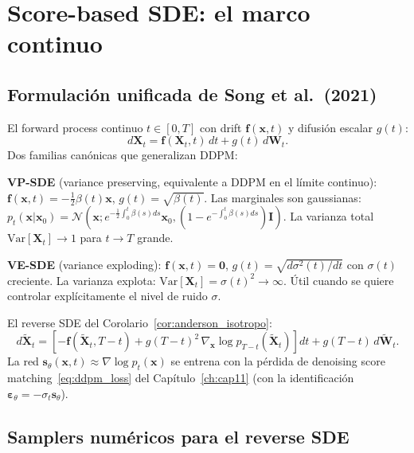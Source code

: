 \section{Score-based SDE: el marco continuo}
\label{sec:score_sde}

\subsection{Formulación unificada de Song et al.\ (2021)}
\label{subsec:score_sde_formulacion}

El forward process continuo $t\in[0,T]$ con drift $\bm{f}(\bm{x},t)$ y difusión
escalar $g(t)$:
\begin{equation}
  d\bm{X}_t = \bm{f}(\bm{X}_t,t)\,dt + g(t)\,d\bm{W}_t.
  \label{eq:score_sde_forward}
\end{equation}
Dos familias canónicas que generalizan DDPM:

\textbf{VP-SDE} (variance preserving, equivalente a DDPM en el límite continuo):
$\bm{f}(\bm{x},t) = -\frac{1}{2}\beta(t)\bm{x}$, $g(t) = \sqrt{\beta(t)}$.
Las marginales son gaussianas: $p_t(\bm{x}|\bm{x}_0) = \mathcal{N}(\bm{x};
e^{-\frac{1}{2}\int_0^t\beta(s)ds}\bm{x}_0, (1-e^{-\int_0^t\beta(s)ds})\bm{I})$.
La varianza total $\mathrm{Var}[\bm{X}_t] \to 1$ para $t\to T$ grande.

\textbf{VE-SDE} (variance exploding): $\bm{f}(\bm{x},t) = \bm{0}$, $g(t) =
\sqrt{d\sigma^2(t)/dt}$ con $\sigma(t)$ creciente. La varianza explota:
$\mathrm{Var}[\bm{X}_t] = \sigma(t)^2 \to\infty$. Útil cuando se quiere
controlar explícitamente el nivel de ruido $\sigma$.

El reverse SDE del Corolario~\ref{cor:anderson_isotropo}:
\begin{equation}
  d\tilde{\bm{X}}_t = \left[-\bm{f}(\tilde{\bm{X}}_t,T{-}t)
  + g(T{-}t)^2\,\nabla_{\bm{x}}\log p_{T-t}(\tilde{\bm{X}}_t)\right]dt
  + g(T{-}t)\,d\tilde{\bm{W}}_t.
  \label{eq:score_sde_reverse}
\end{equation}
La red $\bm{s}_\theta(\bm{x},t) \approx \nabla\log p_t(\bm{x})$ se entrena
con la pérdida de denoising score matching~\eqref{eq:ddpm_loss} del Capítulo~\ref{ch:cap11}
(con la identificación $\bm{\varepsilon}_\theta = -\sigma_t\bm{s}_\theta$).

\subsection{Samplers numéricos para el reverse SDE}
\label{subsec:score_sde_samplers}

